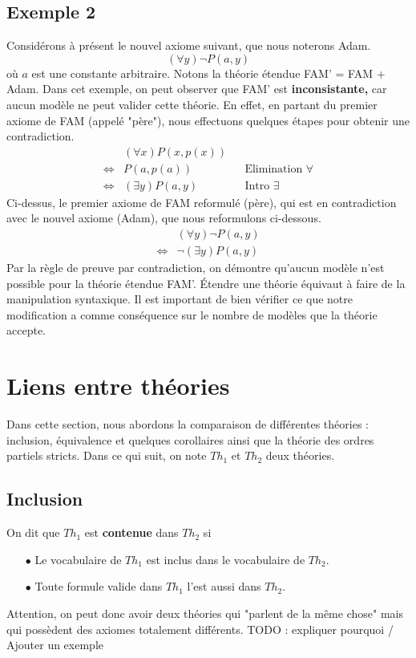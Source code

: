 \subsection*{Exemple 2}
Considérons à présent le nouvel axiome suivant, que nous noterons Adam.
$$ (\forall y) \neg P(a,y) $$
où $a$ est une constante arbitraire. Notons la théorie étendue FAM' = FAM + Adam. Dans cet exemple, on peut observer que FAM' est \textbf{inconsistante,} car aucun modèle ne peut valider cette théorie. En effet, en partant du premier axiome de FAM (appelé "père"), nous effectuons quelques étapes pour obtenir une contradiction.
\begin{align*}
& (\forall x) P(x,p(x)) \\
\iff & P(a,p(a)) && \textrm{Elimination } \forall \\
\iff & (\exists y) P(a,y) && \textrm{Intro } \exists
\end{align*}
Ci-dessus, le premier axiome de FAM reformulé (père), qui est en contradiction avec le nouvel axiome (Adam), que nous reformulons ci-dessous.
\begin{align*}
& (\forall y) \neg P(a,y) \\
\iff & \neg (\exists y) P(a,y)
\end{align*}
Par la règle de preuve par contradiction, on démontre qu'aucun modèle n'est possible pour la théorie étendue FAM'. \'{E}tendre une théorie équivaut à faire de la manipulation syntaxique. Il est important de bien vérifier ce que notre modification a comme conséquence sur le nombre de modèles que la théorie accepte.

\section{Liens entre théories}
Dans cette section, nous abordons la comparaison de différentes théories : inclusion, équivalence et quelques corollaires ainsi que la théorie des ordres partiels stricts. Dans ce qui suit, on note $Th_1$ et $Th_2$ deux théories.

\subsection*{Inclusion}
On dit que $Th_1$ est \textbf{contenue} dans $Th_2$ si
\begin{itemize}
\item[$\bullet$] Le vocabulaire de $Th_1$ est inclus dans le vocabulaire de $Th_2$.
\item[$\bullet$] Toute formule valide dans $Th_1$ l'est aussi dans $Th_2$.
\end{itemize}
Attention, on peut donc avoir deux théories qui "parlent de la même chose" mais qui possèdent des axiomes totalement différents.
TODO : expliquer pourquoi / Ajouter un exemple

